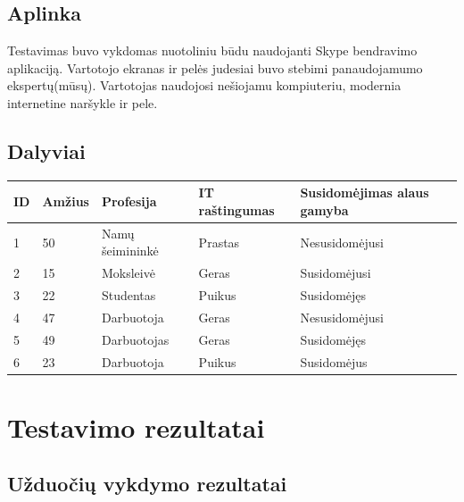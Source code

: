 \documentclass[oneside]{VUMIFPSkursinis}
\begin{document}
	\subsection{Aplinka}
		Testavimas buvo vykdomas nuotoliniu būdu naudojanti Skype bendravimo aplikaciją.
		Vartotojo ekranas ir pelės judesiai buvo stebimi panaudojamumo ekspertų(mūsų).
		Vartotojas naudojosi nešiojamu kompiuteriu, modernia internetine naršykle ir pele.
	\subsection{Dalyviai}
\begin{center}
    \begin{tabular}{ |p{1cm} | p{2cm} | p{4cm} | p{4cm} | p{4cm} |}
    \hline
	ID&Amžius&Profesija&IT raštingumas&Susidomėjimas alaus gamyba\\ \hline
	1&50&Namų šeimininkė&Prastas&Nesusidomėjusi \\ \hline
	2&15&Moksleivė&Geras&Susidomėjusi \\ \hline
	3&22&Studentas&Puikus&Susidomėjęs \\ \hline
	4&47&Darbuotoja&Geras&Nesusidomėjusi \\ \hline
	5&49&Darbuotojas&Geras&Susidomėjęs \\ \hline
	6&23&Darbuotoja&Puikus&Susidomėjus \\ \hline
   \hline
    \end{tabular}
\end{center}



\section{Testavimo rezultatai}
	\subsection{Užduočių vykdymo rezultatai}
\end{document}
